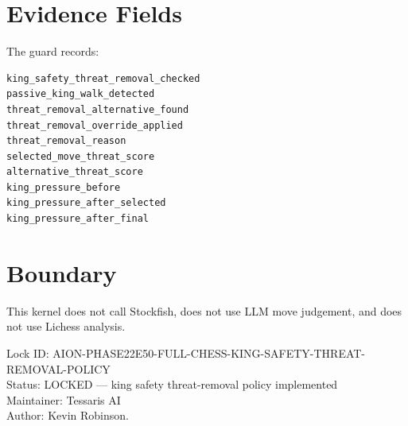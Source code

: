 \documentclass[11pt,a4paper]{article}
\begin{document}
\section{Evidence Fields}

The guard records:

\begin{verbatim}
king_safety_threat_removal_checked
passive_king_walk_detected
threat_removal_alternative_found
threat_removal_override_applied
threat_removal_reason
selected_move_threat_score
alternative_threat_score
king_pressure_before
king_pressure_after_selected
king_pressure_after_final
\end{verbatim}

\section{Boundary}

This kernel does not call Stockfish, does not use LLM move judgement, and does not use Lichess analysis.

\bigskip

\noindent
Lock ID: AION-PHASE22E50-FULL-CHESS-KING-SAFETY-THREAT-REMOVAL-POLICY\\
Status: LOCKED --- king safety threat-removal policy implemented\\
Maintainer: Tessaris AI\\
Author: Kevin Robinson.
\end{document}
